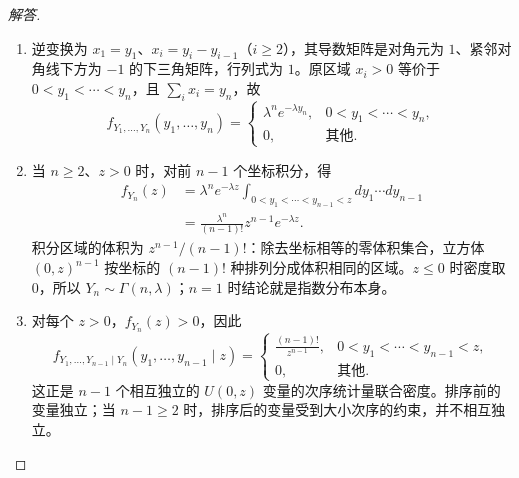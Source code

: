 \begin{proof}[解答]
\begin{enumerate}
\item 逆变换为 $x_1=y_1$、$x_i=y_i-y_{i-1}$（$i\geq2$），其导数矩阵是对角元为 $1$、紧邻对角线下方为 $-1$ 的下三角矩阵，行列式为 $1$。原区域 $x_i>0$ 等价于 $0<y_1<\cdots<y_n$，且 $\sum_i x_i=y_n$，故
\[
f_{Y_1,\ldots,Y_n}(y_1,\ldots,y_n)=
\begin{cases}
\lambda^ne^{-\lambda y_n},&0<y_1<\cdots<y_n,\\
0,&\text{其他}.
\end{cases}
\]

\item 当 $n\geq2$、$z>0$ 时，对前 $n-1$ 个坐标积分，得
\begin{align*}
f_{Y_n}(z)
&=\lambda^ne^{-\lambda z}
  \int_{0<y_1<\cdots<y_{n-1}<z}dy_1\cdots dy_{n-1}\\
&=\frac{\lambda^n}{(n-1)!}z^{n-1}e^{-\lambda z}.
\end{align*}
积分区域的体积为 $z^{n-1}/(n-1)!$：除去坐标相等的零体积集合，立方体 $(0,z)^{n-1}$ 按坐标的 $(n-1)!$ 种排列分成体积相同的区域。$z\leq0$ 时密度取 $0$，所以 $Y_n\sim\Gamma(n,\lambda)$；$n=1$ 时结论就是指数分布本身。

\item 对每个 $z>0$，$f_{Y_n}(z)>0$，因此
\[
f_{Y_1,\ldots,Y_{n-1}\mid Y_n}(y_1,\ldots,y_{n-1}\mid z)=
\begin{cases}
\displaystyle\frac{(n-1)!}{z^{n-1}},
&0<y_1<\cdots<y_{n-1}<z,\\
0,&\text{其他}.
\end{cases}
\]
这正是 $n-1$ 个相互独立的 $U(0,z)$ 变量的次序统计量联合密度。排序前的变量独立；当 $n-1\geq2$ 时，排序后的变量受到大小次序的约束，并不相互独立。
\end{enumerate}
\end{proof}
